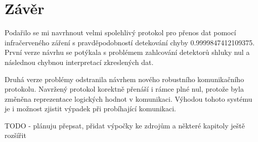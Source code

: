 \chapter{Závěr}

Podařilo se mi navrhnout velmi spolehlivý protokol pro přenos dat pomocí infračerveného záření s pravděpodobností detekování chyby 0.9999847412109375. První verze návrhu se potýkala s problémem zahlcování detektorů shluky nul a následnou chybnou interpretací zkreslených dat.

Druhá verze problémy odstranila návrhem nového robustního komunikačního protokolu. Navržený protokol korektně přenáší i rámce plné nul, protože byla změněna reprezentace logických hodnot v komunikaci. Výhodou tohoto systému je i možnost zjistit výpadek při probíhající komunikaci.

TODO - plánuju přepsat, přidat výpočky ke zdrojům a některé kapitoly ještě rozšířit
